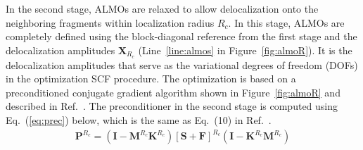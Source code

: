 \documentclass[aip,jcp,reprint,amsmath,amssymb]{revtex4-1}
\begin{document}
In the second stage, ALMOs are relaxed to allow delocalization onto the neighboring fragments within localization radius $R_{c}$. In this stage, ALMOs are completely defined using the block-diagonal reference from the first stage and the delocalization amplitudes $\mathbf{X}_{R_c}$ (Line~\ref{line:almos} in Figure~\ref{fig:almoR}). It is the delocalization amplitudes that serve as the variational degrees of freedom (DOFs) in the optimization SCF procedure. The optimization is based on a preconditioned conjugate gradient algorithm shown in Figure~\ref{fig:almoR} and described in Ref.~. The preconditioner in the second stage is computed using Eq.~(\ref{eq:prec}) below, which is the same as Eq.~(10) in Ref.~.
%
\begin{eqnarray}\label{eq:prec}
\mathbf{P}^{R_c} =  (\mathbf{I} - \mathbf{M}^{R_c} \mathbf{K}^{R_c}) [\mathbf{S+F}]^{R_c} (\mathbf{I} - \mathbf{K}^{R_c} \mathbf{M}^{R_c})
\end{eqnarray}
\end{document}
